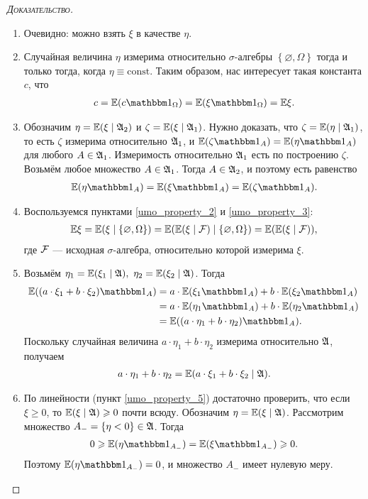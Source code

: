 \documentclass[../main.tex]{subfiles}
\begin{document}
\begin{proof}[\normalfont\textsc{Доказательство}]\
 \begin{enumerate}
  \item Очевидно: можно взять $ \xi $ в качестве $ \eta $.
  \item Случайная величина $ \eta $ измерима относительно $ \sigma $-алгебры $ \left\{ \varnothing, \Omega \right\} $ тогда и только тогда, когда $ \eta \equiv \mathrm{const} $. Таким образом, нас интересует такая константа $ c $, что
   \begin{align*}
    c = \E(c \Ind_\Omega) = \E(\xi \Ind_\Omega) = \E\xi.
   \end{align*}
  \item Обозначим $ \eta = \mathbb E(\xi \mid \mathfrak A_2) $ и $ \zeta = \mathbb E(\xi \mid \mathfrak A_1) $. Нужно доказать, что $ \zeta = \mathbb E(\eta \mid \mathfrak A_1) $, то есть $ \zeta $ измерима относительно $ \mathfrak A_1 $, и $ \E(\zeta\Ind_A) = \E(\eta\Ind_A) $ для любого $ A \in \mathfrak A_1 $. Измеримость относительно $ \mathfrak A_1 $ есть по построению $ \zeta $. Возьмём любое множество $ A \in \mathfrak A_1 $. Тогда $ A \in \mathfrak A_2 $, и поэтому есть равенство
   \begin{align*}
    \E(\eta \Ind_A) = \E(\xi\Ind_A) = \E(\zeta \Ind_A).
   \end{align*}

  \item Воспользуемся пунктами \ref{umo_property_2} и \ref{umo_property_3}:
   \begin{align*}
    \mathbb E\xi = \mathbb E(\xi \mid \{\varnothing, \Omega\}) = \mathbb E(\mathbb E(\xi \mid \mathcal F) \mid \{\varnothing, \Omega\}) = \mathbb E(\mathbb E(\xi \mid \mathcal F)),
   \end{align*} где $ \mathcal F $ --- исходная $ \sigma $-алгебра, относительно которой измерима $ \xi $.
  \item Возьмём $\eta_1 = \E(\xi_1 \mid \A), \ \eta_2 = \E(\xi_2 \mid \A)$. Тогда
   \begin{align*}
    \E((a \cdot \xi_1 + b \cdot \xi_2) \Ind_A) &= a \cdot \E(\xi_1 \Ind_A) + b \cdot \E(\xi_2 \Ind_A) \\
    &= a \cdot \E(\eta_1 \Ind_A) + b \cdot \E(\eta_2 \Ind_A) \\
    &= \E((a \cdot \eta_1 + b \cdot \eta_2) \Ind_A).
   \end{align*}
   Поскольку случайная величина $ a \cdot \eta_ 1 + b \cdot \eta_2 $ измерима относительно $ \mathfrak A $, получаем
   \begin{align*}
    a \cdot \eta_1 + b \cdot \eta_2 = \mathbb E(a \cdot \xi_1 + b \cdot \xi_2 \mid \mathfrak A).
   \end{align*}
  \item По линейности (пункт \ref{umo_property_5}) достаточно проверить, что если $ \xi \geqslant 0 $, то $ \mathbb E(\xi \mid \mathfrak A) \geqslant 0 $ почти всюду. Обозначим $ \eta = \mathbb E(\xi \mid \mathfrak A) $. Рассмотрим множество $ A_- = \left\{ \eta < 0 \right\} \in \mathfrak A $. Тогда 
   \begin{align*}
    0\geqslant \E(\eta \Ind_{A_-}) = \E(\xi\Ind_{A_-}) \geqslant 0.
   \end{align*} Поэтому $ \E(\eta \Ind_{A_-}) = 0 $, и множество $ A_- $ имеет нулевую меру.
 \end{enumerate}
\end{proof}
\end{document}
